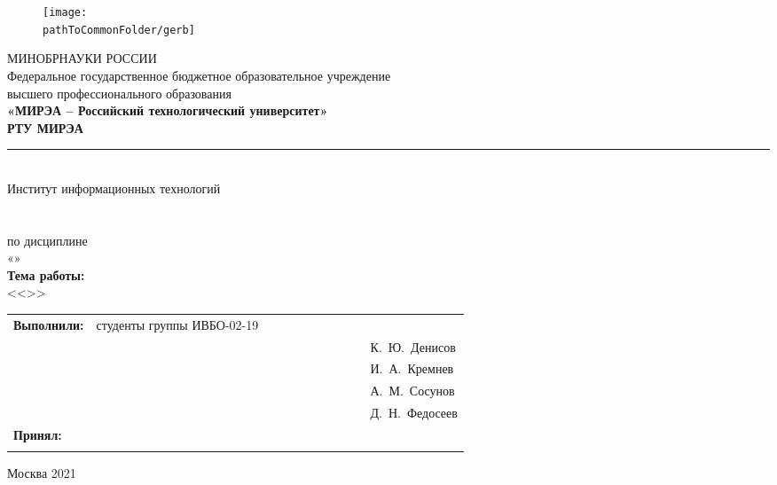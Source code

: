 

\renewcommand{\studentfio}{К.~Ю.~Денисов\\
				& & \hfill И.~А.~Кремнев \\
				& & \hfill А.~М.~Сосунов\\
				& & \hfill Д.~Н.~Федосеев}

\begin{center}
	\begin{figure}[h!]
		\begin{center}
			\texttt{[image: \\pathToCommonFolder/gerb]}
		\end{center}	
	\end{figure}
 	\small	МИНОБРНАУКИ РОССИИ \\
Федеральное государственное бюджетное образовательное учреждение\\
высшего профессионального образования\\
	\normalsize					
	\textbf{«МИРЭА – Российский технологический университет»\\
		РТУ МИРЭА}\\
	\noindent\rule{1\linewidth}{1pt}\\
	Институт информационных технологий\\ %
	\kafedra\\
	\vspace{3ex}
	\large \textbf{\workname}  \\
	по дисциплине\\ «\discipline» \\
	\vspace{3ex}
	\if \withouttheme
	\textbf{Тема работы:}\\ <<\theme>>
	\fi
	\vspace{6ex}
	\small
	\begin{table}[h!]
		\begin{tabular}{lp{0.6\linewidth}l}
			\textbf{Выполнили:} & студенты группы ИВБО-02-19 & \\ 
			& & \hfill \studentfio \\%
			\textbf{Принял:} & \rang & \\
			& & \hfill \teacherfio\\
		\end{tabular}
	\end{table}

	\normalsize
	
	\vfill
	Москва 2021
	
\end{center}